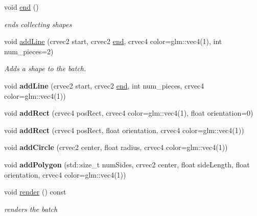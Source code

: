 \begin{DoxyCompactItemize}
void \hyperlink{classnta_1_1DebugBatch_abc2f517c6dd1fb4a65624335d11c92f1}{end} ()
\begin{DoxyCompactList}\small\item\em ends collecting shapes \end{DoxyCompactList}\item 
\mbox{\label{classnta_1_1DebugBatch_abc7c94706f334db36992b486885868a2}} 
void \hyperlink{classnta_1_1DebugBatch_abc7c94706f334db36992b486885868a2}{add\+Line} (crvec2 start, crvec2 \hyperlink{classnta_1_1DebugBatch_abc2f517c6dd1fb4a65624335d11c92f1}{end}, crvec4 color=glm\+::vec4(1), int num\+\_\+pieces=2)
\begin{DoxyCompactList}\small\item\em Adds a shape to the batch. \end{DoxyCompactList}\item 
\mbox{\label{classnta_1_1DebugBatch_aeb4dbbdb8501560147df6ae3c37f706e}} 
void {\bfseries add\+Line} (crvec2 start, crvec2 \hyperlink{classnta_1_1DebugBatch_abc2f517c6dd1fb4a65624335d11c92f1}{end}, int num\+\_\+pieces, crvec4 color=glm\+::vec4(1))
\item 
\mbox{\label{classnta_1_1DebugBatch_afd4376b4d4532995c7a7ca2766627d48}} 
void {\bfseries add\+Rect} (crvec4 pos\+Rect, crvec4 color=glm\+::vec4(1), float orientation=0)
\item 
\mbox{\label{classnta_1_1DebugBatch_a8b83a2974e7eaaa5bca4bd8038bda51d}} 
void {\bfseries add\+Rect} (crvec4 pos\+Rect, float orientation, crvec4 color=glm\+::vec4(1))
\item 
\mbox{\label{classnta_1_1DebugBatch_a15f5ca4fb6f93d67c417795b5aa8a255}} 
void {\bfseries add\+Circle} (crvec2 center, float radius, crvec4 color=glm\+::vec4(1))
\item 
\mbox{\label{classnta_1_1DebugBatch_af610dfb8caf64615bc14cd96eee2a432}} 
void {\bfseries add\+Polygon} (std\+::size\+\_\+t num\+Sides, crvec2 center, float side\+Length, float orientation, crvec4 color=glm\+::vec4(1))
\item 
\mbox{\label{classnta_1_1DebugBatch_a3188990f4fd9aeede13573fe00bd0cf4}} 
void \hyperlink{classnta_1_1DebugBatch_a3188990f4fd9aeede13573fe00bd0cf4}{render} () const
\begin{DoxyCompactList}\small\item\em renders the batch \end{DoxyCompactList}\end{DoxyCompactItemize}
